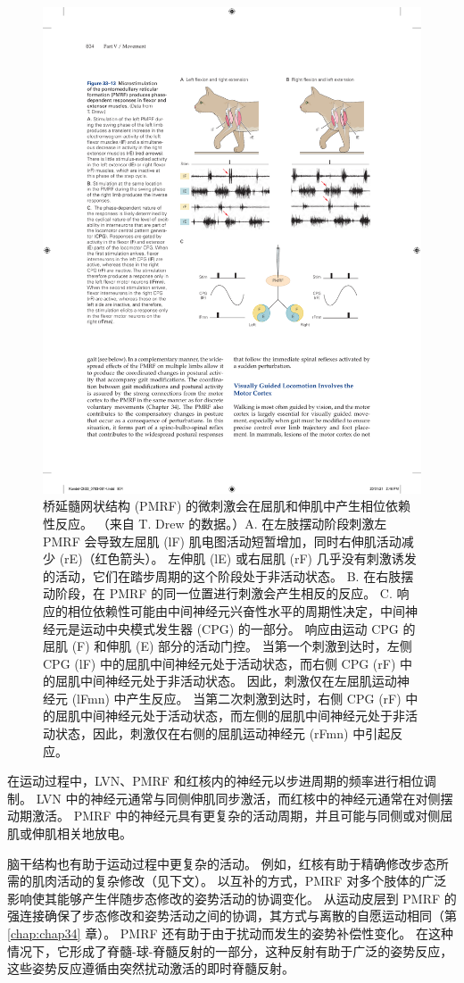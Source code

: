 \begin{figure}[htbp]
	\centering
	\includegraphics[width=0.7\linewidth]{chap33/fig_33_13}
	\caption{桥延髓网状结构 (PMRF) 的微刺激会在屈肌和伸肌中产生相位依赖性反应。 （来自 T. Drew 的数据。）A. 在左肢摆动阶段刺激左 PMRF 会导致左屈肌 (lF) 肌电图活动短暂增加，同时右伸肌活动减少 (rE)（红色箭头）。 左伸肌 (lE) 或右屈肌 (rF) 几乎没有刺激诱发的活动，它们在踏步周期的这个阶段处于非活动状态。 B. 在右肢摆动阶段，在 PMRF 的同一位置进行刺激会产生相反的反应。 C. 响应的相位依赖性可能由中间神经元兴奋性水平的周期性决定，中间神经元是运动中央模式发生器 (CPG) 的一部分。 响应由运动 CPG 的屈肌 (F) 和伸肌 (E) 部分的活动门控。 当第一个刺激到达时，左侧 CPG (lF) 中的屈肌中间神经元处于活动状态，而右侧 CPG (rF) 中的屈肌中间神经元处于非活动状态。 因此，刺激仅在左屈肌运动神经元 (lFmn) 中产生反应。 当第二次刺激到达时，右侧 CPG (rF) 中的屈肌中间神经元处于活动状态，而左侧的屈肌中间神经元处于非活动状态，因此，刺激仅在右侧的屈肌运动神经元 (rFmn) 中引起反应。}
	\label{fig:33_13}
\end{figure}


在运动过程中，LVN、PMRF 和红核内的神经元以步进周期的频率进行相位调制。
LVN 中的神经元通常与同侧伸肌同步激活，而红核中的神经元通常在对侧摆动期激活。
PMRF 中的神经元具有更复杂的活动周期，并且可能与同侧或对侧屈肌或伸肌相关地放电。


脑干结构也有助于运动过程中更复杂的活动。
例如，红核有助于精确修改步态所需的肌肉活动的复杂修改（见下文）。
以互补的方式，PMRF 对多个肢体的广泛影响使其能够产生伴随步态修改的姿势活动的协调变化。
从运动皮层到 PMRF 的强连接确保了步态修改和姿势活动之间的协调，其方式与离散的自愿运动相同（第 \ref{chap:chap34} 章）。
PMRF 还有助于由于扰动而发生的姿势补偿性变化。
在这种情况下，它形成了脊髓-球-脊髓反射的一部分，这种反射有助于广泛的姿势反应，这些姿势反应遵循由突然扰动激活的即时脊髓反射。



